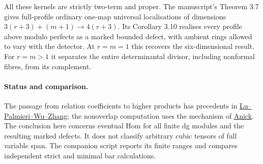 \documentclass[11pt]{article}
\begin{document}
All these kernels are strictly two-term and proper. The manuscript's
Theorem 3.7 gives full-profile ordinary one-map universal localisations
of dimensions $3(r+3)+(m+1)\to4(r+3)$. Its Corollary 3.10 realises every
profile above modulo perfects as a marked bounded defect, with ambient
rings allowed to vary with the detector. At $r=m=1$ this recovers the
six-dimensional result. For $r=m>1$ it separates the entire determinantal
divisor, including nonformal fibres, from its complement.

\paragraph{Status and comparison.}
The passage from relation coefficients to higher products has precedents
in \href{https://arxiv.org/abs/math/0606144}{Lu--Palmieri--Wu--Zhang};
the nonoverlap computation uses the mechanism of
\href{https://doi.org/10.1016/0021-8693(82)90104-1}{Anick}.
The conclusion here concerns eventual Hom for all finite dg modules
and the resulting marked defects. It does not classify arbitrary cubic
tensors of full variable span. The companion script reports its finite
ranges and compares independent strict and minimal bar calculations.
\end{document}
